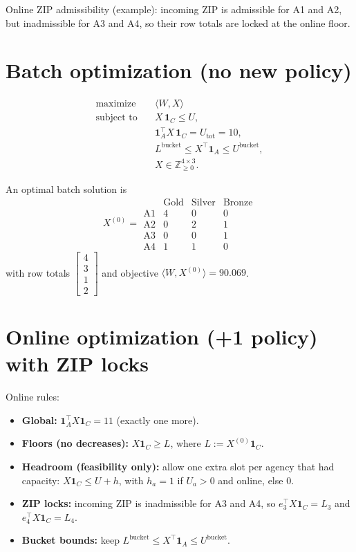 \documentclass[11pt]{article}
\begin{document}
Online ZIP admissibility (example): incoming ZIP is admissible for A1 and A2, but
inadmissible for A3 and A4, so their row totals are locked at the online floor.

\section*{Batch optimization (no new policy)}
\[
\begin{aligned}
\text{maximize}\quad & \langle W,X\rangle \\[2pt]
\text{subject to}\quad
& X\,\mathbf{1}_C \le U, \\[2pt]
& \mathbf{1}_A^\top X\,\mathbf{1}_C = U_{\text{tot}}=10, \\[2pt]
& L^{\text{bucket}} \le X^\top \mathbf{1}_A \le U^{\text{bucket}}, \\[2pt]
& X \in \mathbb{Z}_{\ge 0}^{4\times 3}.
\end{aligned}
\]

An optimal batch solution is
\[
X^{(0)}=
\begin{array}{c|ccc}
 & \text{Gold} & \text{Silver} & \text{Bronze} \\\hline
\text{A1} & 4 & 0 & 0 \\
\text{A2} & 0 & 2 & 1 \\
\text{A3} & 0 & 0 & 1 \\
\text{A4} & 1 & 1 & 0
\end{array}
\]
with row totals $\begin{bmatrix}4\\[2pt]3\\[2pt]1\\[2pt]2\end{bmatrix}$ and
objective $\langle W,X^{(0)}\rangle=90.069$.

\section*{Online optimization (+1 policy) with ZIP locks}
Online rules:
\begin{itemize}[leftmargin=*]
\item \textbf{Global:} $\mathbf{1}_A^\top X\mathbf{1}_C=11$ (exactly one more).
\item \textbf{Floors (no decreases):} $X\mathbf{1}_C \ge L$, where $L:=X^{(0)}\mathbf{1}_C$.
\item \textbf{Headroom (feasibility only):} allow one extra slot per agency that had capacity:
$X\mathbf{1}_C \le U+h$, with $h_a=1$ if $U_a>0$ and online, else $0$.
\item \textbf{ZIP locks:} incoming ZIP is inadmissible for A3 and A4, so
$e_3^\top X\mathbf{1}_C=L_3$ and $e_4^\top X\mathbf{1}_C=L_4$.
\item \textbf{Bucket bounds:} keep $L^{\text{bucket}}\le X^\top \mathbf{1}_A \le U^{\text{bucket}}$.
\end{itemize}
\end{document}
